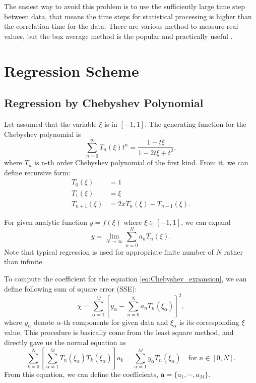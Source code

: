 \documentclass[10pt, a4paper]{article}
\begin{document}
\begin{appendices}
  The easiest way to avoid this problem is to use the sufficiently large time step between data, that means the time steps for statistical processing is higher than the correlation time for the data. There are various method to measure real values, but the box average method is the popular and practically useful \parencite{allen1989computer}.

  \section{Regression Scheme}
  \subsection{Regression by Chebyshev Polynomial}
  Let assumed that the variable $\xi$ is in $[-1, 1]$.
  The generating function for the Chebyshev polynomial is
  \begin{equation}
    \sum_{n=0}^{\infty}T_n(\xi)t^n = \frac{1 - t\xi}{1 - 2t\xi + t^2},
  \end{equation}
  where $T_n$ is n-th order Chebyshev polynomial of the first kind. 
  From it, we can define recursive form:
  \begin{align}
    T_0(\xi) & = 1 \\
    T_1(\xi) & = \xi \\
    T_{n+1}(\xi) & = 2xT_n(\xi) - T_{n-1}(\xi).\label{eq:Chebyshev_recursion}
  \end{align}

  For given analytic function $y = f(\xi)$ where $\xi \in [-1, 1]$, we can expand
  \begin{equation}
    y = \lim_{N\to\infty}\sum_{n=0}^{N} a_nT_n(\xi).\label{eq:Chebyshev_expansion}
  \end{equation}
  Note that typical regression is used for appropriate finite number of $N$ rather than infinite. 

  To compute the coefficient for the equation \eqref{eq:Chebyshev_expansion}, we can define following sum of square error (SSE):
  \begin{equation}
    \chi = \sum_{\alpha=1}^{M} \left[y_\alpha - \sum_{n=0}^{N}a_nT_n(\xi_\alpha)\right]^2,
  \end{equation}
  where $y_\alpha$ denote $\alpha$-th components for given data and $\xi_\alpha$ is its corresponding $\xi$ value.
  This procedure is basically come from the least square method, and directly gave us the normal equation as
  \begin{equation}
    \sum_{k=0}^{N}\left[\sum_{\alpha=1}^{M}T_n(\xi_\alpha)T_k(\xi_\alpha)\right]a_k = \sum_{\alpha=1}^{M}y_{\alpha}T_n(\xi_\alpha)\quad\textrm{for } n\in [0, N].
  \end{equation}
  From this equation, we can define the coefficients, $\mathbf{a} = \{a_1,\cdots,a_M\}$.


\end{appendices}
\end{document}
